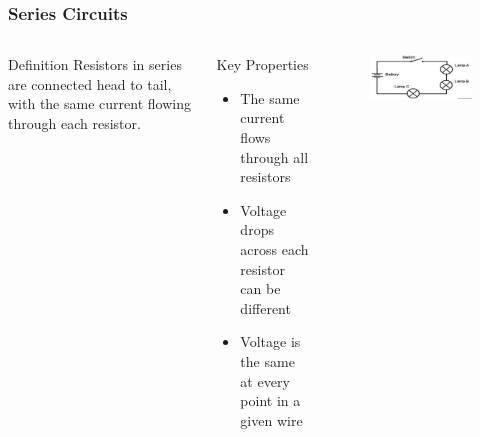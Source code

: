 \documentclass{beamer}
\begin{document}
\begin{frame}
    \frametitle{Series Circuits}
    \begin{columns}
        \begin{block}{Definition}
            Resistors in series are connected head to tail, with the same current flowing through each resistor.
        \end{block}
        
        \begin{block}{Key Properties}
            \begin{itemize}
                \item The same current flows through all resistors
                \item Voltage drops across each resistor can be different
                \item Voltage is the same at every point in a given wire
            \end{itemize}
        \end{block}
        
        \begin{alertblock}{ }
           \begin{figure}
               \centering
               \includegraphics[width=1\linewidth]{phys11-circuits-series-resistors.png}
           \end{figure}
        \end{alertblock}
    \end{columns}
\end{frame}
\end{document}
